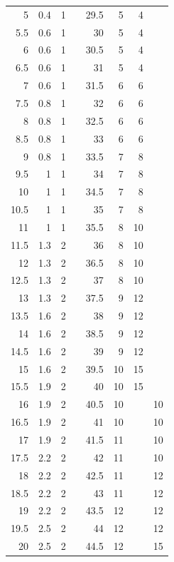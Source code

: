 \begin{table}
\begin{center}
\begin{tabular}[ht]{rrrr|rrrr}
        5 & 0.4 & 1 & & 29.5 &   5 &  4 & \\
      5.5 & 0.6 & 1 & &   30 &   5 &  4 & \\
        6 & 0.6 & 1 & & 30.5 &   5 &  4 & \\
      6.5 & 0.6 & 1 & &   31 &   5 &  4 & \\
        7 & 0.6 & 1 & & 31.5 &   6 &  6 & \\
      7.5 & 0.8 & 1 & &   32 &   6 &  6 & \\
        8 & 0.8 & 1 & & 32.5 &   6 &  6 & \\
      8.5 & 0.8 & 1 & &   33 &   6 &  6 & \\
        9 & 0.8 & 1 & & 33.5 &   7 &  8 & \\
      9.5 &   1 & 1 & &   34 &   7 &  8 & \\
       10 &   1 & 1 & & 34.5 &   7 &  8 & \\
     10.5 &   1 & 1 & &   35 &   7 &  8 & \\
       11 &   1 & 1 & & 35.5 &   8 & 10 & \\
     11.5 & 1.3 & 2 & &   36 &   8 & 10 & \\
       12 & 1.3 & 2 & & 36.5 &   8 & 10 & \\
     12.5 & 1.3 & 2 & &   37 &   8 & 10 & \\
       13 & 1.3 & 2 & & 37.5 &   9 & 12 & \\
     13.5 & 1.6 & 2 & &   38 &   9 & 12 & \\
       14 & 1.6 & 2 & & 38.5 &   9 & 12 & \\
     14.5 & 1.6 & 2 & &   39 &   9 & 12 & \\
       15 & 1.6 & 2 & & 39.5 &  10 & 15 & \\
     15.5 & 1.9 & 2 & &   40 &  10 & 15 & \\
       16 & 1.9 & 2 & & 40.5 &  10 &    & 10 \\
     16.5 & 1.9 & 2 & &   41 &  10 &    & 10 \\
       17 & 1.9 & 2 & & 41.5 &  11 &    & 10 \\
     17.5 & 2.2 & 2 & &   42 &  11 &    & 10 \\
       18 & 2.2 & 2 & & 42.5 &  11 &    & 12 \\
     18.5 & 2.2 & 2 & &   43 &  11 &    & 12 \\
       19 & 2.2 & 2 & & 43.5 &  12 &    & 12 \\
     19.5 & 2.5 & 2 & &   44 &  12 &    & 12 \\
       20 & 2.5 & 2 & & 44.5 &  12 &    & 15 \\

\end{tabular}
\end{center}
\end{table}

